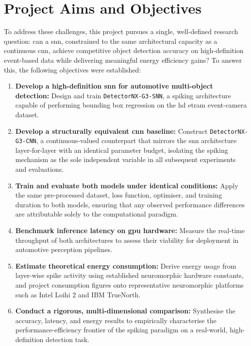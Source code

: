 \section{Project Aims and Objectives}
\label{sec:intro_aims_objectives}

To address these challenges, this project pursues a single, well-defined research question: can a \gls{snn}, constrained to the same architectural capacity as a continuous \gls{cnn}, achieve competitive object detection accuracy on high-definition event-based data while delivering meaningful energy efficiency gains? To answer this, the following objectives were established:

\begin{enumerate}
    \item \textbf{Develop a high-definition \gls{snn} for automotive multi-object detection:} 
    Design and train \texttt{DetectorNX-G3-SNN}, a spiking architecture capable of performing bounding box regression on the \gls{hd} \gls{etram} event-camera dataset.

    \item \textbf{Develop a structurally equivalent \gls{cnn} baseline:} 
    Construct \texttt{DetectorNX-G3-CNN}, a continuous-valued counterpart that mirrors the \gls{snn} architecture layer-for-layer with an identical parameter budget, isolating the spiking mechanism as the sole independent variable in all subsequent experiments and evaluations.

    \item \textbf{Train and evaluate both models under identical conditions:} 
    Apply the same pre-processed dataset, loss function, optimiser, and training duration to both models, ensuring that any observed performance differences are attributable solely to the computational paradigm.

    \item \textbf{Benchmark inference latency on \gls{gpu} hardware:} 
    Measure the real-time throughput of both architectures to assess their viability for deployment in automotive perception pipelines.

    \item \textbf{Estimate theoretical energy consumption:} 
    Derive energy usage from layer-wise spike activity using established neuromorphic hardware constants, and project consumption figures onto representative neuromorphic platforms such as Intel Loihi 2 and IBM TrueNorth.

    \item \textbf{Conduct a rigorous, multi-dimensional comparison:} 
    Synthesise the accuracy, latency, and energy results to empirically characterise the performance-efficiency frontier of the spiking paradigm on a real-world, high-definition detection task.
    
\end{enumerate}

